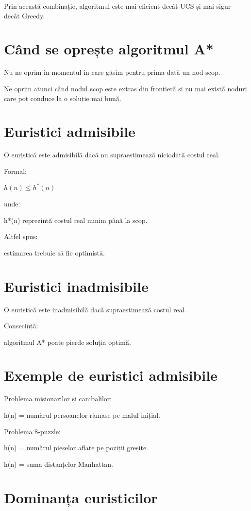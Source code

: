 \documentclass[12pt,a4paper]{article}
\begin{document}
Prin această combinație, algoritmul este mai eficient decât UCS și mai sigur decât Greedy.

\section{Când se oprește algoritmul A*}

Nu ne oprim în momentul în care găsim pentru prima dată un nod scop.

Ne oprim atunci când nodul scop este extras din frontieră și nu mai există noduri care pot conduce la o soluție mai bună.

\section{Euristici admisibile}

O euristică este admisibilă dacă nu supraestimează niciodată costul real.

Formal:

$h(n) \le h^{*}(n)$

unde:

h*(n) reprezintă costul real minim până la scop.

Altfel spus:

estimarea trebuie să fie optimistă.

\section{Euristici inadmisibile}

O euristică este inadmisibilă dacă supraestimează costul real.

Consecință:

algoritmul A* poate pierde soluția optimă.

\section{Exemple de euristici admisibile}

Problema misionarilor și canibalilor:

h(n) = numărul persoanelor rămase pe malul inițial.

Problema 8-puzzle:

h(n) = numărul pieselor aflate pe poziții greșite.

h(n) = suma distanțelor Manhattan.

\section{Dominanța euristicilor}
\end{document}
